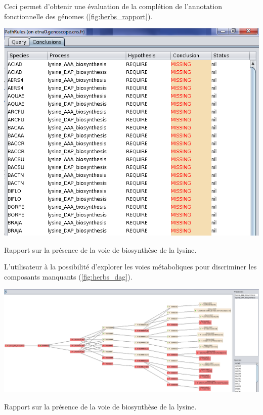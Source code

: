 \begin{refsegment}
Ceci permet d'obtenir une évaluation de la complétion de l'annotation fonctionnelle des génomes (\cref{fig:herbs_rapport}).

\begin{shadedfigure}[H]
    \centering
    \includegraphics[width=\textwidth]{img/herbs_conclusion_report.png}
    \caption{Rapport sur la présence de la voie de biosynthèse de la lysine.}
    \label{fig:herbs_rapport}
\end{shadedfigure}

L'utilisateur à la possibilité d'explorer les voies métaboliques pour discriminer les composants manquants (\cref{fig:herbs_dag}).

\begin{landscape}
    \begin{shadedfigure}[H]
        \centering
        \includegraphics[width=\textwidth]{img/herbs_aciad_lysine_dap.png}
        \caption{Rapport sur la présence de la voie de biosynthèse de la lysine.}
        \label{fig:herbs_dag}
    \end{shadedfigure}
\end{landscape}



\end{refsegment}
